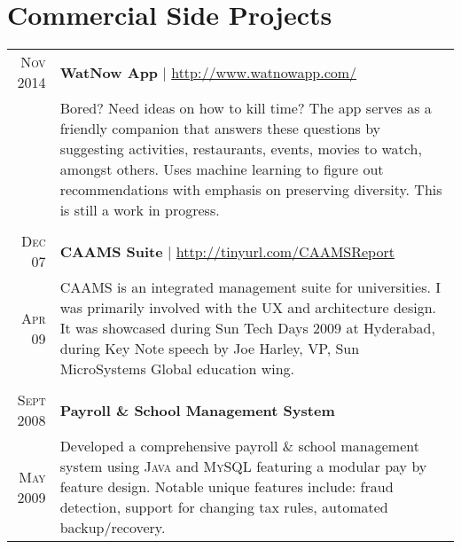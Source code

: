 \documentclass[a4paper,11pt]{article}
\begin{document}
\section{Commercial Side Projects}
\begin{longtable}{r|p{12.5cm}}
\textsc{Nov 2014} & \textbf{WatNow App} | \href{http://www.watnowapp.com/}{http://www.watnowapp.com/} \\
 & \footnotesize{ \begin{minipage}[t]{12.5cm} Bored? Need ideas on how to kill time? The app serves as a friendly companion that answers these questions by suggesting activities, restaurants, events, movies to watch, amongst others. Uses machine learning to figure out recommendations with emphasis on preserving diversity. This is still a work in progress. 
 \end{minipage}}
 \\
 \multicolumn{2}{c}{}
 \\
  \textsc{Dec 07} & \textbf{CAAMS Suite} | \href{http://tinyurl.com/CAAMSReport}{http://tinyurl.com/CAAMSReport}\\
 \textsc{Apr 09} & \footnotesize{ \begin{minipage}[t]{12.5cm}
 CAAMS is an integrated management suite for universities. I was primarily involved with the UX and architecture design. It was showcased during Sun Tech Days 2009 at Hyderabad, during Key Note speech by Joe Harley, VP, Sun MicroSystems Global education wing. 
 \end{minipage}}
 \\
 \multicolumn{2}{c}{}
 \\
 \textsc{Sept 2008} & \textbf{Payroll \& School Management System} \\
 \textsc{May 2009} & \footnotesize{ \begin{minipage}[t]{12.5cm} Developed a comprehensive payroll \& school management system using \textsc{Java} and \textsc{MySQL} featuring a modular pay by feature design. Notable unique features include: fraud detection, support for changing tax rules, automated backup/recovery.
 \end{minipage}}\\
\end{longtable}
\end{document}

